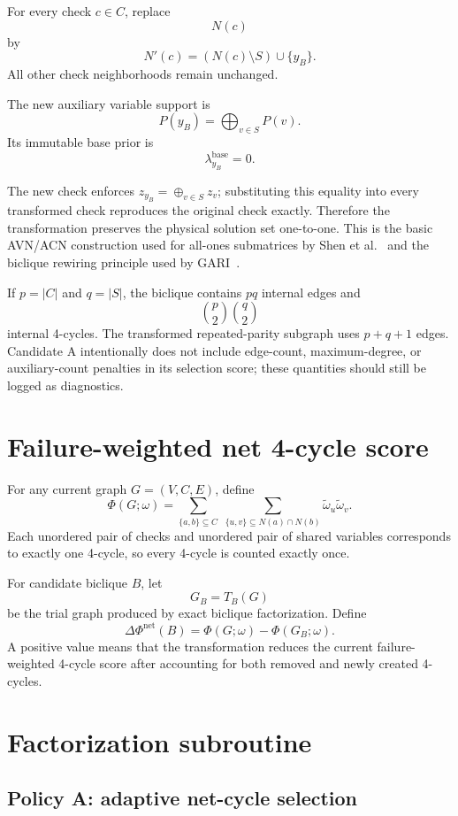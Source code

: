 \documentclass[11pt,a4paper]{article}
\begin{document}
For every check $c\in C$, replace
\[
N(c)
\]
by
\[
\boxed{
N'(c)
=
\left(N(c)\setminus S\right)\cup\{y_B\}.
}
\]
All other check neighborhoods remain unchanged.

The new auxiliary variable support is
\[
\boxed{
P(y_B)
=
\bigoplus_{v\in S}P(v).
}
\]
Its immutable base prior is
\[
\lambda_{y_B}^{\mathrm{base}}=0.
\]

The new check enforces $z_{y_B}=\oplus_{v\in S}z_v$; substituting this equality
into every transformed check reproduces the original check exactly. Therefore
the transformation preserves the physical solution set one-to-one. This is
the basic AVN/ACN construction used for all-ones submatrices by Shen et
al.~\cite{shen} and the biclique rewiring principle used by GARI~\cite{gari}.

If $p=|C|$ and $q=|S|$, the biclique contains $pq$ internal edges and
\[
\binom p2\binom q2
\]
internal 4-cycles. The transformed repeated-parity subgraph uses $p+q+1$
edges. Candidate A intentionally does not include edge-count, maximum-degree,
or auxiliary-count penalties in its selection score; these quantities should
still be logged as diagnostics.

\section{Failure-weighted net 4-cycle score}

For any current graph $G=(V,C,E)$, define
\[
\boxed{
\Phi(G;\omega)
=
\sum_{\{a,b\}\subseteq C}
\;
\sum_{\{u,v\}\subseteq N(a)\cap N(b)}
\widetilde\omega_u\widetilde\omega_v.
}
\]
Each unordered pair of checks and unordered pair of shared variables
corresponds to exactly one 4-cycle, so every 4-cycle is counted exactly once.

For candidate biclique $B$, let
\[
G_B=T_B(G)
\]
be the trial graph produced by exact biclique factorization. Define
\[
\boxed{
\Delta\Phi^{\mathrm{net}}(B)
=
\Phi(G;\omega)-\Phi(G_B;\omega).
}
\]
A positive value means that the transformation reduces the current
failure-weighted 4-cycle score after accounting for both removed and newly
created 4-cycles.

\section{Factorization subroutine}

\subsection{Policy A: adaptive net-cycle selection}
\end{document}
